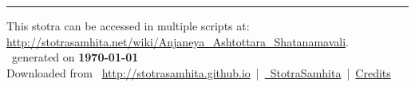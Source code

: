 \documentclass[a5paper,twoside,12pt]{book}
\begin{document}
\setmainfont[Script=Devanagari,Mapping=tex-text]{Sanskrit 2003}
\fontsize {16}{19.25}\selectfont
\let\head\chapt
\begin{center}

\end{center}
\vfill
\centering
\rule{0.8\textwidth}{0.6pt}

\footnotesize
{}\sffamily
This stotra can be accessed in multiple scripts at:\\
\url{http://stotrasamhita.net/wiki/Anjaneya_Ashtottara_Shatanamavali}.\\[1ex]
\faFilePdfO~generated on \textbf{\today}\\[1ex]
Downloaded from \faGlobe{}~\url{http://stotrasamhita.github.io}~|~\href{https://github.com/StotraSamhita}{\faGithubSquare{}~StotraSamhita}~|~\href{https://stotrasamhita.github.io/about/}{Credits}
\end{document}
